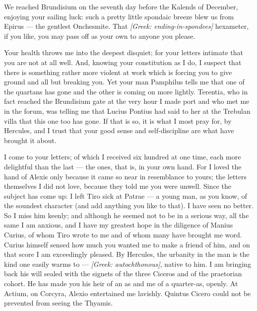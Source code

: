 

 We reached Brundisium on the seventh day before the Kalends of December, enjoying your sailing luck: such a pretty little spondaic breeze blew us from Epirus --- the gentlest Onchesmite. That \textit{[Greek: ending-in-spondees]} hexameter, if you like, you may pass off as your own to anyone you please.

 Your health throws me into the deepest disquiet; for your letters intimate that you are not at all well. And, knowing your constitution as I do, I suspect that there is something rather more violent at work which is forcing you to give ground and all but breaking you. Yet your man Pamphilus tells me that one of the quartans has gone and the other is coming on more lightly. Terentia, who in fact reached the Brundisium gate at the very hour I made port and who met me in the forum, was telling me that Lucius Pontius had said to her at the Trebulan villa that this one too has gone. If that is so, it is what I most pray for, by Hercules, and I trust that your good sense and self-discipline are what have brought it about.

 I come to your letters; of which I received six hundred at one time, each more delightful than the last --- the ones, that is, in your own hand. For I loved the hand of Alexis only because it came so near in resemblance to yours; the letters themselves I did not love, because they told me you were unwell. Since the subject has come up: I left Tiro sick at Patrae --- a young man, as you know, of the soundest character (and add anything you like to that). I have seen no better. So I miss him keenly; and although he seemed not to be in a serious way, all the same I am anxious, and I have my greatest hope in the diligence of Manius Curius, of whom Tiro wrote to me and of whom many have brought me word. Curius himself sensed how much you wanted me to make a friend of him, and on that score I am exceedingly pleased. By Hercules, the urbanity in the man is the kind one easily warms to --- \textit{[Greek: autochthonous]}, native to him. I am bringing back his will sealed with the signets of the three Ciceros and of the praetorian cohort. He has made you his heir of an as and me of a quarter-as, openly. At Actium, on Corcyra, Alexio entertained me lavishly. Quintus Cicero could not be prevented from seeing the Thyamis.

